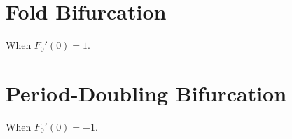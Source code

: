 \documentclass[11pt]{book}
\begin{document}
\section{Fold Bifurcation}
When $F_0'(0) = 1$.
\section{Period-Doubling Bifurcation}
When $F_0'(0) = -1$.
\end{document}

